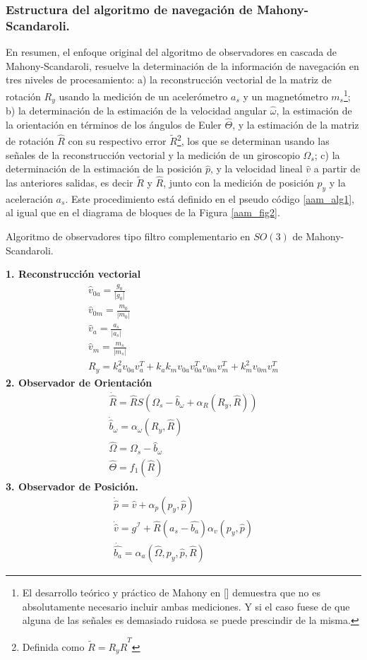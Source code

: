 \documentclass[10pt]{report}
\numberwithin{equation}{chapter}
\numberwithin{algorithm}{chapter}
\begin{document}
\subsubsection{Estructura del algoritmo de navegación de Mahony-Scandaroli.}
En resumen, el enfoque original del algoritmo de observadores en cascada de Mahony-Scandaroli, resuelve la determinación de la información de navegación en tres niveles de procesamiento:
a) la reconstrucción vectorial de la matriz de rotación $R_y$ usando la medición de un acelerómetro $a_s$ y un magnetómetro $m_s$\footnote{El desarrollo teórico y práctico de Mahony en [\cite{Mahony2008}] demuestra que no es absolutamente necesario incluir ambas mediciones. Y si el caso fuese de que alguna de las señales es demasiado ruidosa se puede prescindir de la misma.}; b) la determinación de la estimación de la velocidad angular $\hat{\omega}$, la estimación de la orientación en términos de los ángulos de Euler $\hat{\Theta}$, y la estimación de la matriz de rotación $\hat{R}$ con su respectivo error $\tilde{R}$\footnote{Definida como $\tilde{R}=R_y\hat{R}^T$}, los que se determinan usando las señales de la reconstrucción vectorial y la medición de un giroscopio $\Omega_s$; c) la determinación de la estimación de la posición $\hat{p}$, y la velocidad lineal $\hat{v}$ a partir de las anteriores salidas, es decir $\tilde{R}$ y $\hat{R}$, junto con la medición de posición $p_y$ y la aceleración $a_s$. Este procedimiento está definido en el pseudo código \ref{aam_alg1}, al igual que en el diagrama de bloques de la Figura \ref{aam_fig2}.
\begin{algorithm}[ht]
\caption{Algoritmo de observadores tipo filtro complementario en $SO(3)$ de Mahony-Scandaroli.}\scriptsize
\label{aam_alg1}
\begin{algorithmic}
\State\textbf{1. Reconstrucción vectorial}
\begin{gather*}
\hat{v}_{0a}=\frac{g_0}{|g_0|}\\
\hat{v}_{0m}=\frac{m_0}{|m_0|}\\
\hat{v}_{a}=\frac{a_s}{|a_s|}\\
\hat{v}_{m}=\frac{m_s}{|m_s|}\\
R_y=k_a^2v_{0a}v^T_a+k_ak_mv_{0a}v^T_{0a}v_{0m}
v^T_m+k_m^2v_{0m}v^T_m
\end{gather*}
\State\textbf{2. Observador de Orientación}
\begin{gather*}
\dot{\hat{R}}=\hat{R}S(\Omega_s-\hat{b}_{\omega}+\alpha_R(R_y,\hat{R}))\\
\dot{\hat{b}}_\omega=\alpha_\omega(R_y,\hat{R})\\
\hat{\Omega}=\Omega_s-\hat{b}_{\omega}\\
\hat{\Theta}=f_1(\hat{R})
\end{gather*}
\State\textbf{3. Observador de Posición.}
\begin{gather*}
\dot{\hat{p}}=\hat{v}+\alpha_p(p_y,\hat{p})\\
\dot{\hat{v}}=g^\mathcal{I}+\hat{R}(a_s-\hat{b_a})\alpha_v(p_y,\hat{p})\\
\dot{\hat{b_a}}=\alpha_a(\hat{\Omega},p_y,\hat{p},\hat{R})
\end{gather*}
\end{algorithmic}
\end{algorithm}\par
\end{document}
